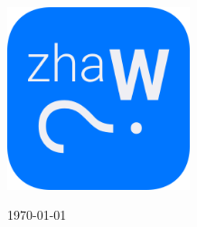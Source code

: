 \begin{titlepage}

	\vfill\vfill\vfill %
	\includegraphics[width=0.4\textwidth]{logo.png}\\[1cm]



	\vfill\vfill

	{\large\today} %

	\vfill %

\end{titlepage}
